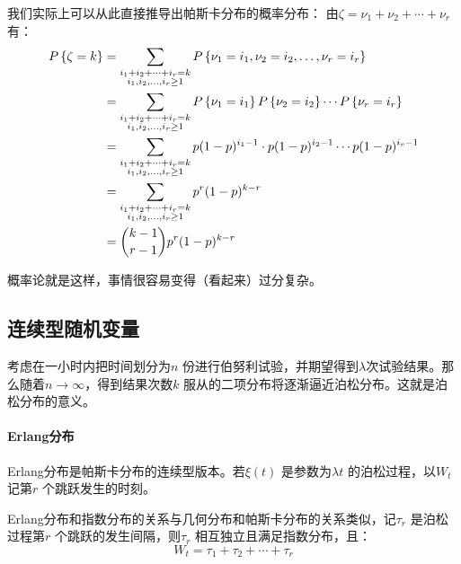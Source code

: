 我们实际上可以从此直接推导出帕斯卡分布的概率分布：
由\(\zeta = \nu_{1} + \nu_{2} + \cdots + \nu_{r}\) 有：
\begin{align*}
    \P{\zeta=k} &=
    \sum_{\substack{i_{1}+i_{2}+\dots +i_{r}=k
    \\ i_{1},i_{2},\ldots,i_{r}\geq 1}} \P{\nu_{1}=i_{1},
    \nu_{2}=i_{2}, \ldots, \nu_{r}=i_{r}} \\
    &=\sum_{\substack{i_{1}+i_{2}+\dots +i_{r}=k
    \\ i_{1},i_{2},\ldots,i_{r}\geq 1}} P\left\{
    \nu_{1}=i_{1}\right\} \P{ \nu_{2}=i_{2} }
    \cdots \P{ \nu_{r}=i_{r} } \\
    &= \sum_{\substack{i_{1}+i_{2}+\dots +i_{r}=k
    \\ i_{1},i_{2},\ldots,i_{r}\geq 1}} p(1-p)^{i_{1}-1}
    \cdot p(1-p)^{i_{2}-1} \cdots p(1-p)^{i_{r}-1} \\
    &= \sum_{\substack{i_{1}+i_{2}+\dots +i_{r}=k
    \\ i_{1},i_{2},\ldots,i_{r}\geq 1}} p^{r} (1-p)^{k-r} \\
    &= \binom{k-1}{r-1} p^{r} (1-p)^{k-r}
\end{align*}

概率论就是这样，事情很容易变得（看起来）过分复杂。

\subsection{连续型随机变量}
考虑在一小时内把时间划分为\(n\) 份进行伯努利试验，并期望得到\(\lambda\)次试验结果。那么随着\(n
\to \infty\)，得到结果次数\(k\) 服从的二项分布将逐渐逼近泊松分布。这就是泊松分布的意义。

\paragraph{Erlang分布} Erlang分布是帕斯卡分布的连续型版本。若\(\xi(t)\)
是参数为\(\lambda t\) 的泊松过程，以\(W_{t}\) 记第\(r\) 个跳跃发生的时刻。

Erlang分布和指数分布的关系与几何分布和帕斯卡分布的关系类似，记\(\tau_{r}\) 是泊松过程第\(r\)
个跳跃的发生间隔，则\(\tau_{r}\) 相互独立且满足指数分布，且：
\[
    W_{t} = \tau_{1} + \tau_{2} + \cdots + \tau_{r}
\]

